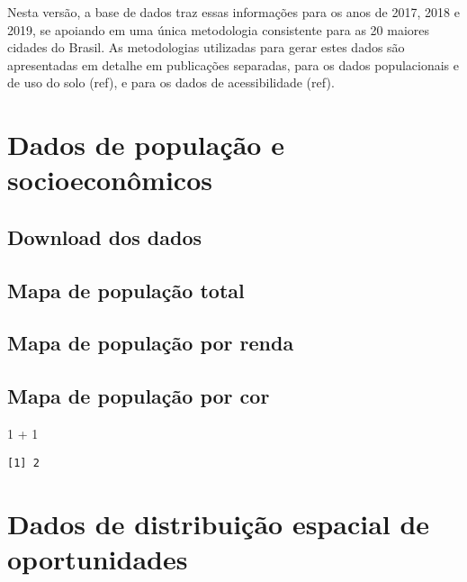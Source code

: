 \documentclass[
  letterpaper,
  DIV=11,
  numbers=noendperiod]{scrreprt}
\newenvironment{Shaded}{\begin{snugshade}}{\end{snugshade}}
\newcommand{\DecValTok}[1]{\textcolor[rgb]{0.68,0.00,0.00}{#1}}
\newcommand{\SpecialCharTok}[1]{\textcolor[rgb]{0.37,0.37,0.37}{#1}}
\begin{document}
Nesta versão, a base de dados traz essas informações para os anos de
2017, 2018 e 2019, se apoiando em uma única metodologia consistente para
as 20 maiores cidades do Brasil. As metodologias utilizadas para gerar
estes dados são apresentadas em detalhe em publicações separadas, para
os dados populacionais e de uso do solo (ref), e para os dados de
acessibilidade (ref).

\hypertarget{dados-de-populauxe7uxe3o-e-socioeconuxf4micos}{%
\chapter{Dados de população e
socioeconômicos}\label{dados-de-populauxe7uxe3o-e-socioeconuxf4micos}}

\hypertarget{download-dos-dados}{%
\section{Download dos dados}\label{download-dos-dados}}

\hypertarget{mapa-de-populauxe7uxe3o-total}{%
\section{Mapa de população total}\label{mapa-de-populauxe7uxe3o-total}}

\hypertarget{mapa-de-populauxe7uxe3o-por-renda}{%
\section{Mapa de população por
renda}\label{mapa-de-populauxe7uxe3o-por-renda}}

\hypertarget{mapa-de-populauxe7uxe3o-por-cor}{%
\section{Mapa de população por
cor}\label{mapa-de-populauxe7uxe3o-por-cor}}

\begin{Shaded}
\begin{Highlighting}[]
\DecValTok{1} \SpecialCharTok{+} \DecValTok{1}
\end{Highlighting}
\end{Shaded}

\begin{verbatim}
[1] 2
\end{verbatim}

\hypertarget{dados-de-distribuiuxe7uxe3o-espacial-de-oportunidades}{%
\chapter{Dados de distribuição espacial de
oportunidades}\label{dados-de-distribuiuxe7uxe3o-espacial-de-oportunidades}}
\end{document}
